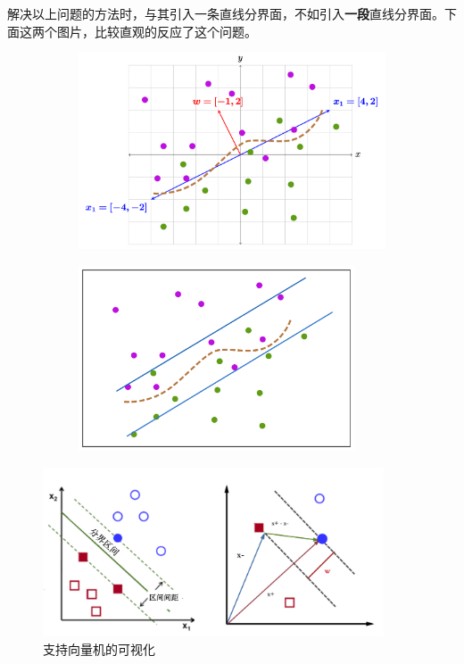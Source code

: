 \documentclass[12pt]{article}
\numberwithin{figure}{section}
\newenvironment{fullmodel}{
			\smallskip\noindent
			\begin{minipage}{\textwidth+\marginparwidth+\marginparsep}\smallskip\smallskip}
			{\smallskip\smallskip\end{minipage}\vspace{.1in}
			}
\numberwithin{equation}{section}
\begin{document}
\begin{fullmodel}
解决以上问题的方法时，与其引入一条直线分界面，不如引入\textbf{一段}直线分界面。下面这两个图片，比较直观的反应了这个问题。
	\begin{figure}[H]
		\centering
		\begin{subfigure}[b]{0.45\textwidth}
		\centering
		\includegraphics[width=\textwidth]{fig/C2C2svm1}	
		\end{subfigure}
		\begin{subfigure}[b]{0.45\textwidth}
		\centering
		\includegraphics[width=0.9\textwidth]{fig/C2C2svm2}	
		\end{subfigure}
	\end{figure}
	\begin{figure}[H]
		\centering
		\includegraphics[width=0.9\textwidth]{fig/C2C2svm3}
		\caption{支持向量机的可视化}
	\end{figure}
\end{fullmodel}
\end{document}
